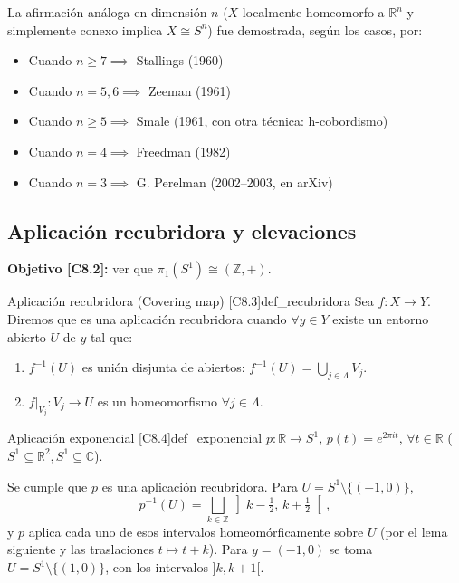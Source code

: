 La afirmación análoga en dimensión $n$ ($X$ localmente homeomorfo a $\mathbb{R}^n$ y simplemente conexo implica $X \cong S^n$) fue demostrada, según los casos, por:

\begin{itemize}
    \item Cuando $n\geq 7 \implies$ Stallings (1960)
    \item Cuando $n=5,6 \implies$ Zeeman (1961)
    \item Cuando $n\geq 5 \implies$ Smale (1961, con otra técnica: h-cobordismo)
    \item Cuando $n=4 \implies$ Freedman (1982)
    \item Cuando $n=3 \implies$ G. Perelman (2002--2003, en arXiv)
\end{itemize}

\vspace{0.5cm}
\subsection{Aplicación recubridora y elevaciones}

\textbf{Objetivo [C8.2]:} ver que $\pi_1(S^1) \cong (\mathbb{Z},+)$.

\begin{definicion}{Aplicación recubridora (Covering map) [C8.3]}{def_recubridora}
Sea $f: X \to Y$. Diremos que es una aplicación recubridora cuando $\forall y \in Y$ existe un entorno abierto $U$ de $y$ tal que:
\begin{enumerate}
    \item $f^{-1}(U)$ es unión disjunta de abiertos: $f^{-1}(U) = \bigcup_{j \in \Lambda} V_j$.
    \item $f|_{V_j} : V_j \to U$ es un homeomorfismo $\forall j \in \Lambda$.
\end{enumerate}
\end{definicion}

\begin{definicion}{Aplicación exponencial [C8.4]}{def_exponencial}
$p: \mathbb{R} \to S^1$, $p(t) = e^{2\pi i t}$, $\forall t \in \mathbb{R}$ ($S^1 \subseteq \mathbb{R}^2, S^1 \subseteq \mathbb{C}$).

Se cumple que $p$ es una aplicación recubridora. Para $U = S^1 \setminus \{(-1,0)\}$,
\[ p^{-1}(U) = \bigsqcup_{k \in \mathbb{Z}} \left] k - \tfrac12,\, k + \tfrac12 \right[, \]
y $p$ aplica cada uno de esos intervalos homeomórficamente sobre $U$ (por el lema siguiente y las traslaciones $t \mapsto t + k$). Para $y = (-1,0)$ se toma $U = S^1 \setminus \{(1,0)\}$, con los intervalos $]k, k+1[$.
\end{definicion}

